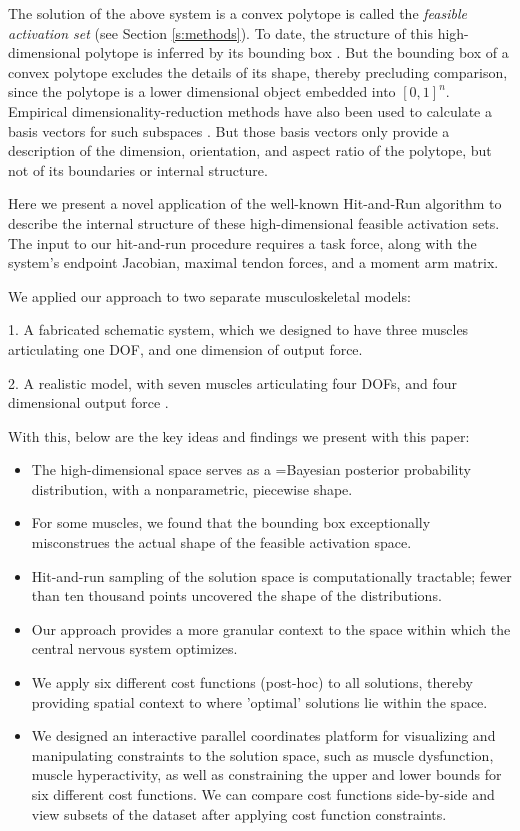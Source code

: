 The solution of the above system is a convex polytope is called the \emph{feasible activation set} (see Section \ref{s:methods}). To date, the structure of this high-dimensional polytope is inferred by its bounding box  \cite{kutch2011muscle,sohn2013cat_bounding_box,Valero-Cuevas2015high-dimensional}.  But the bounding box of a convex polytope excludes the details of its shape, thereby precluding comparison, since the polytope is a lower dimensional object embedded into $[0,1]^n$.  Empirical dimensionality-reduction methods have also been used to calculate a basis vectors for such subspaces \cite{Clewley2008Estimating,davella2005shared,krishnamoorthy2003muscle}. But those basis  vectors only provide a description of the dimension, orientation, and aspect ratio of the polytope, but not of its boundaries or internal  structure.

Here we present a novel application of the well-known Hit-and-Run algorithm \cite{smith1984efficient} to describe the internal structure of these high-dimensional feasible activation sets. The input to our hit-and-run procedure requires a task force, along with the system's endpoint Jacobian, maximal tendon forces, and a moment arm matrix.

We applied our approach to two separate musculoskeletal models:

1. A fabricated schematic system, which we designed to have three muscles articulating one DOF, and one dimension of output force.

2. A realistic model, with seven muscles articulating four DOFs, and four dimensional output force \cite{Valero-Cuevas1998Large}.

With this, below are the key ideas and findings we present with this paper:

\begin{itemize}
\item {The high-dimensional space serves as a =Bayesian posterior probability distribution, with a nonparametric, piecewise shape.}
\item {For some muscles, we found that the bounding box exceptionally misconstrues the actual shape of the feasible activation space.}
\item {Hit-and-run sampling of the solution space is computationally tractable; fewer than ten thousand points uncovered the shape of the distributions.}
\item {Our approach provides a more granular context to the space within which the central nervous system optimizes.}
\item {We apply six different cost functions (post-hoc) to all solutions, thereby providing spatial context to where 'optimal' solutions lie within the space.}
\item {We designed an interactive parallel coordinates platform for visualizing and manipulating constraints to the solution space, such as muscle dysfunction, muscle hyperactivity, as well as constraining the upper and lower bounds for six different cost functions. We can compare cost functions side-by-side and view subsets of the dataset after applying cost function constraints. }
\end{itemize}

